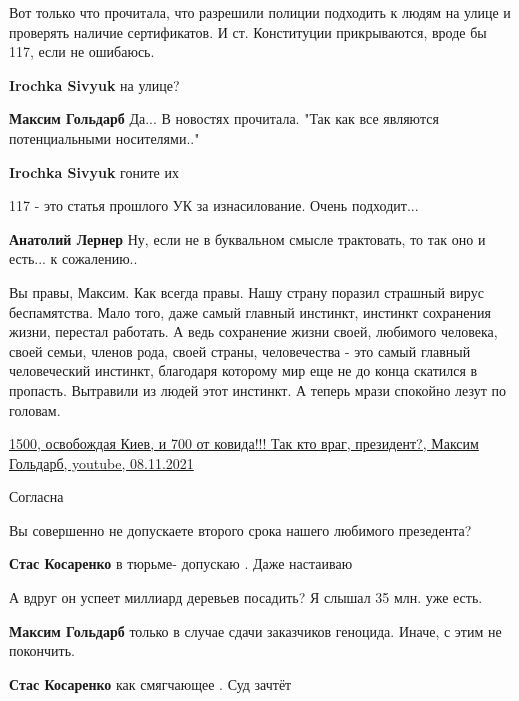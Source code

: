 \begin{itemize}

Вот только что прочитала, что разрешили полиции подходить к людям на улице и
проверять наличие сертификатов. И ст. Конституции прикрываются, вроде бы 117,
если не ошибаюсь.

\begin{itemize} %
\textbf{Irochka Sivyuk} на улице?

\textbf{Максим Гольдарб} Да... В новостях прочитала. "Так как все являются потенциальными носителями.."

\textbf{Irochka Sivyuk} гоните их

117 - это статья прошлого УК за изнасилование. Очень подходит...

\textbf{Анатолий Лернер} Ну, если не в буквальном смысле трактовать, то так оно и есть... к сожалению..
\end{itemize} %


Вы правы, Максим. Как всегда правы. Нашу страну поразил страшный вирус
беспамятства. Мало того, даже самый главный инстинкт, инстинкт сохранения
жизни, перестал работать. А ведь сохранение жизни своей, любимого человека,
своей семьи, членов рода, своей страны, человечества - это самый главный
человеческий инстинкт, благодаря которому мир еще не до конца скатился в
пропасть. Вытравили из людей этот инстинкт. А теперь мрази спокойно лезут по
головам.


\href{https://youtu.be/X-00R13myMM}{%
1500, освобождая Киев, и 700 от ковида!!! Так кто враг, президент?, Максим Гольдарб, youtube, %
08.11.2021%
}

Согласна

Вы совершенно не допускаете второго срока нашего любимого презедента?

\begin{itemize} %
\textbf{Стас Косаренко} в тюрьме- допускаю . Даже настаиваю

А вдруг он успеет миллиард деревьев посадить? Я слышал 35 млн. уже есть.

\textbf{Максим Гольдарб} только в случае сдачи заказчиков геноцида. Иначе, с этим не покончить.

\textbf{Стас Косаренко} как смягчающее . Суд зачтёт


\end{itemize}
\end{itemize}
